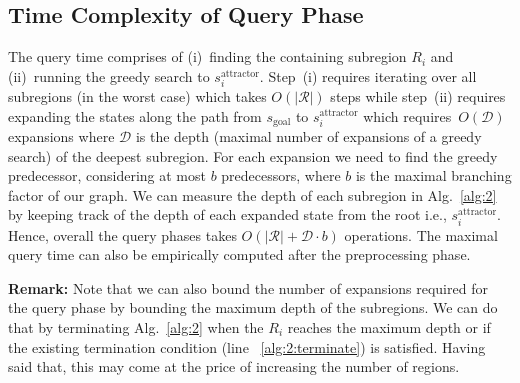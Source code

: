 \documentclass[letterpaper]{article} %
\newcommand{\calR}{\ensuremath{\mathcal{R}}\xspace}
\newcommand{\calD}{\ensuremath{\mathcal{D}}\xspace}
\newcommand{\sAttract}{\ensuremath{s^{\text{attractor}}_i}\xspace}
\newcommand{\sGoal}{\ensuremath{s_{\text{goal}}\xspace}}
\begin{document}
\subsection{Time Complexity of Query Phase}
\label{subsec:complexity}
The query time comprises of 
(i)~finding the containing subregion $R_i$ 
and
(ii)~running the greedy search to $\sAttract$.
Step~(i) requires iterating over all subregions (in the worst case) which takes $O(|\calR|)$ steps while 
step~(ii) requires expanding the states along the path from $\sGoal$ to $\sAttract$ which requires~$O(\calD)$ expansions where $\calD$ is the depth (maximal number of expansions of a greedy search) of the deepest subregion. 
For each expansion we need to find the greedy predecessor, considering at most $b$ predecessors, where $b$ is the maximal branching factor of our graph.
We can measure the depth of each subregion in Alg.~\ref{alg:2} by keeping track of the depth of each expanded state from the root i.e., $\sAttract$. Hence, overall the query phases takes $O(|\calR| + \calD \cdot b)$ operations. The maximal query time can also be empirically computed after the preprocessing phase.

%
\textbf{Remark:}
Note that we can also bound the number of expansions required for the query phase by bounding the maximum depth of the subregions. We can do that by terminating Alg.~\ref{alg:2} when the $R_i$ reaches the maximum depth or if the existing termination condition (line ~\ref{alg:2:terminate}) is satisfied.
Having said that, this may come at the price of increasing the number of regions.
\end{document}
